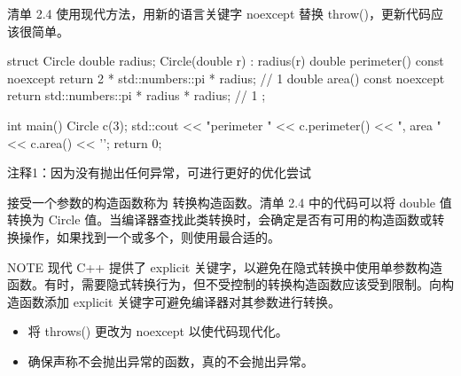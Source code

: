 清单 2.4 使用现代方法，用新的语言关键字 noexcept 替换 throw()，更新代码应该很简单。

\begin{cpp}
struct Circle {
  double radius;
  Circle(double r) : radius(r) {}
  double perimeter() const noexcept { return 2 * std::numbers::pi * radius; } // 1
  double area() const noexcept { return std::numbers::pi * radius * radius; } // 1
};

int main() {
  Circle c(3);
  std::cout << "perimeter " << c.perimeter() << ", area " << c.area() << '\n';
  return 0;
}
\end{cpp}

{\footnotesize
注释1：因为没有抛出任何异常，可进行更好的优化尝试
}

接受一个参数的构造函数称为 转换构造函数。清单 2.4 中的代码可以将 double 值转换为 Circle 值。当编译器查找此类转换时，会确定是否有可用的构造函数或转换操作，如果找到一个或多个，则使用最合适的。

\begin{myNotic}{NOTE}
现代 C++ 提供了 explicit 关键字，以避免在隐式转换中使用单参数构造函数。有时，需要隐式转换行为，但不受控制的转换构造函数应该受到限制。向构造函数添加 explicit 关键字可避免编译器对其参数进行转换。
\end{myNotic}


\begin{itemize}
\item
将 throws() 更改为 noexcept 以使代码现代化。

\item
确保声称不会抛出异常的函数，真的不会抛出异常。
\end{itemize}











